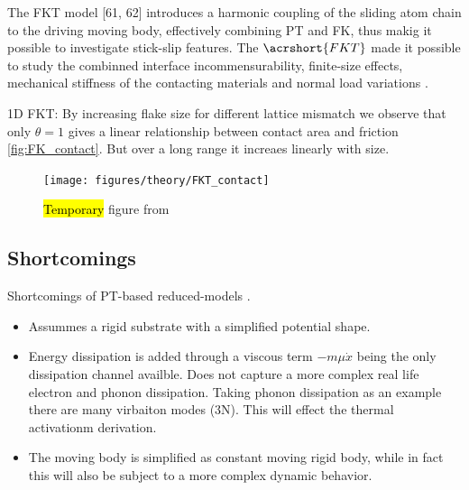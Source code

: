 The \acrshort{FKT} model [61, 62]\cite{Manini_2016} introduces a harmonic coupling of the sliding atom chain to the driving moving body, effectively combining \acrshort{PT} and \acrshort{FK}, thus makig it possible to investigate stick-slip features. The $\acrshort{FKT}$ made it possible to study the combinned interface incommensurability, finite-size effects, mechanical stiffness of the contacting materials and normal load variations \cite{Manini_2016}. 



1D FKT: By increasing flake size for different lattice mismatch we observe that only $\theta = 1$ gives a linear relationship between contact area and friction \cref{fig:FK_contact}. But over a long range it increaes linearly with size. 

\begin{figure}[H]
  \centering
  \texttt{[image: figures/theory/FKT\_contact]}
  \caption{\hl{Temporary} figure from \cite{Yalin_2011} }
  \label{fig:FKT_contact}
\end{figure}



\subsection{Shortcomings}

Shortcomings of PT-based reduced-models \cite{Yalin}. 
\begin{itemize}
  \item Assummes a rigid substrate with a simplified potential shape. 
  \item Energy dissipation is added through a viscous term $-m\mu \dot{x}$ being the only dissipation channel availble. Does not capture a more complex real life electron and phonon dissipation. Taking phonon dissipation as an example there are many virbaiton modes (3N). This will effect the thermal activationm derivation. 
  \item The moving body is simplified as constant moving rigid body, while in fact this will also be subject to a more complex dynamic behavior.
\end{itemize}





